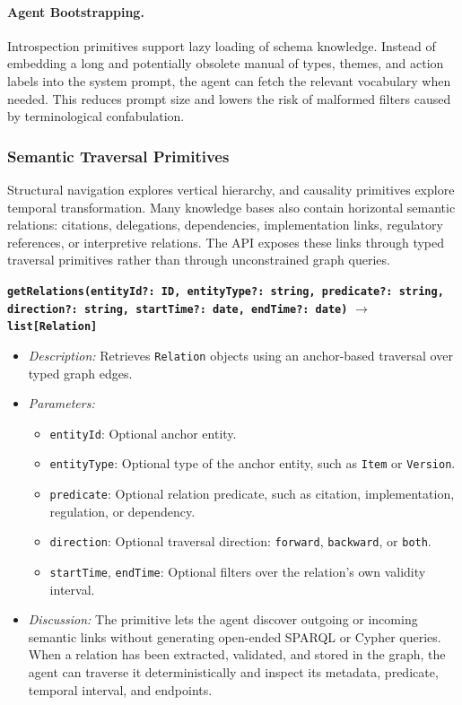 \documentclass[11pt]{article}
\begin{document}
\paragraph{Agent Bootstrapping.}
Introspection primitives support lazy loading of schema knowledge. Instead of embedding a long and potentially obsolete manual of types, themes, and action labels into the system prompt, the agent can fetch the relevant vocabulary when needed. This reduces prompt size and lowers the risk of malformed filters caused by terminological confabulation.

\subsubsection{Semantic Traversal Primitives}
\label{subsubsec:semantic_traversal}

Structural navigation explores vertical hierarchy, and causality primitives explore temporal transformation. Many knowledge bases also contain horizontal semantic relations: citations, delegations, dependencies, implementation links, regulatory references, or interpretive relations. The API exposes these links through typed traversal primitives rather than through unconstrained graph queries.

\vspace{0.3cm}
\noindent\textbf{\texttt{getRelations(entityId?: ID, entityType?: string, predicate?: string,}} \newline
\textbf{\texttt{direction?: string, startTime?: date, endTime?: date)}} \newline
\textbf{\texttt{$\rightarrow$ list[Relation]}}

\begin{itemize}
    \item \textit{Description:} Retrieves \texttt{Relation} objects using an anchor-based traversal over typed graph edges.
    \item \textit{Parameters:}
    \begin{itemize}
        \item \texttt{entityId}: Optional anchor entity.
        \item \texttt{entityType}: Optional type of the anchor entity, such as \texttt{Item} or \texttt{Version}.
        \item \texttt{predicate}: Optional relation predicate, such as citation, implementation, regulation, or dependency.
        \item \texttt{direction}: Optional traversal direction: \texttt{forward}, \texttt{backward}, or \texttt{both}.
        \item \texttt{startTime}, \texttt{endTime}: Optional filters over the relation's own validity interval.
    \end{itemize}
    \item \textit{Discussion:} The primitive lets the agent discover outgoing or incoming semantic links without generating open-ended SPARQL or Cypher queries. When a relation has been extracted, validated, and stored in the graph, the agent can traverse it deterministically and inspect its metadata, predicate, temporal interval, and endpoints.
\end{itemize}
\end{document}
